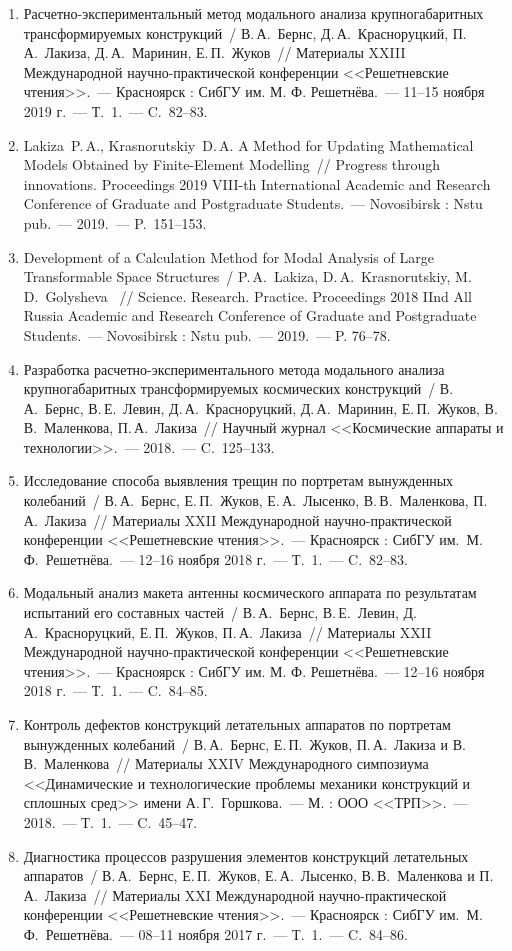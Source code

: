 \begin{enumerate}
	\item Расчетно-экспериментальный метод модального анализа крупногабаритных трансформируемых конструкций~/ В.\,А.~Бернс, Д.\,А.~Красноруцкий, П.\,А.~Лакиза, Д.\,А.~Маринин, Е.\,П.~Жуков~// Материалы XXIII Международной научно-практической конференции <<Решетневские чтения>>.~--- Красноярск : СибГУ им. М. Ф. Решетнёва.~--- 11--15 ноября 2019 г.~--- Т.~1.~--- C.~82--83.
	\item Lakiza~P.\,A., Krasnorutskiy~D.\,A. A Method for Updating Mathematical Models Obtained by Finite-Element Modelling~// Progress through innovations. Proceedings 2019 VIII-th International Academic and Research Conference of Graduate and Postgraduate Students.~--- Novosibirsk : Nstu pub.~--- 2019.~--- P.~151--153.
	\item Development of a Calculation Method for Modal Analysis of Large Transformable Space Structures~/ P.\,A.~Lakiza, D.\,A.~Krasnorutskiy, M.\,D.~Golysheva ~// Science. Research. Practice. Proceedings 2018 IInd All Russia Academic and Research Conference of Graduate and Postgraduate Students.~--- Novosibirsk : Nstu pub.~--- 2019.~--- P. 76--78.
	\item Разработка расчетно-экспериментального метода модального анализа крупногабаритных трансформируемых космических конструкций~/ В.\,А.~Бернс, В.\,Е.~Левин, Д.\,А.~Красноруцкий, Д.\,А.~Маринин, Е.\,П.~Жуков, В.\,В.~Маленкова, П.\,А.~Лакиза~// Научный журнал <<Космические аппараты и технологии>>.~--- 2018.~--- C.~125--133.
	\item Исследование способа выявления трещин по портретам вынужденных колебаний~/ В.\,А.~Бернс, Е.\,П.~Жуков, Е.\,А.~Лысенко, В.\,В.~Маленкова, П.\,А.~Лакиза~// Материалы XXII Международной научно-практической конференции <<Решетневские чтения>>.~--- Красноярск : СибГУ им.~М.\,Ф.~Решетнёва.~--- 12--16 ноября 2018 г.~--- Т.~1.~--- C.~82--83.
	\item Модальный анализ макета антенны космического аппарата по результатам испытаний его составных частей~/ В.\,А.~Бернс, В.\,Е.~Левин, Д.\,А.~Красноруцкий, Е.\,П.~Жуков, П.\,А.~Лакиза~// Материалы XXII Международной научно-практической конференции <<Решетневские чтения>>.~--- Красноярск : СибГУ им. М. Ф. Решетнёва.~--- 12--16 ноября 2018 г.~--- Т.~1.~--- C.~84--85.
	\item Контроль дефектов конструкций летательных аппаратов по портретам вынужденных колебаний~/ В.\,А.~Бернс, Е.\,П.~Жуков, П.\,А.~Лакиза и В.\,В.~Маленкова~// Материалы XXIV Международного симпозиума <<Динамические и технологические проблемы механики конструкций и сплошных сред>> имени А.\,Г.~Горшкова.~--- М. : ООО <<ТРП>>.~--- 2018.~--- Т.~1.~--- C.~45--47.
	\item Диагностика процессов разрушения элементов конструкций летательных аппаратов~/ В.\,А.~Бернс, Е.\,П.~Жуков, Е.\,А.~Лысенко, В.\,В.~Маленкова и П.\,А.~Лакиза~// Материалы XXI Международной научно-практической конференции <<Решетневские чтения>>.~--- Красноярск : СибГУ им.~М.\,Ф.~Решетнёва.~--- 08--11 ноября 2017 г.~--- Т.~1.~--- C.~84--86.
\end{enumerate}
